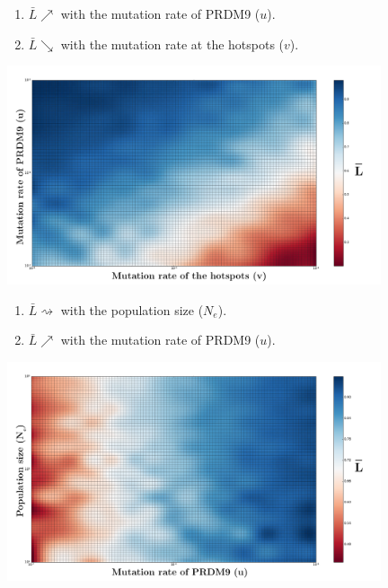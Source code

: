 \documentclass[10pt]{beamer}
\begin{document}
\begin{frame}
	\begin{center}
		\begin{enumerate}
		\item $\bar{L} \nearrow$ with the mutation rate of PRDM9 ($u$).
		
		\item $\bar{L} \searrow$ with the mutation rate at the hotspots ($v$).
	\end{enumerate}
       \includegraphics[width=11cm]{Images/mean-erosion-mutation-erosion.png}
	\end{center}
\end{frame}

\begin{frame}
	\begin{center}
		\begin{enumerate}
		\item $\bar{L} \rightsquigarrow$ with the population size ($N_e$).
		
		\item $\bar{L} \nearrow$ with the mutation rate of PRDM9 ($u$).
	\end{enumerate}
       \includegraphics[width=11cm]{Images/mean-erosion-population-mutation.png}
	\end{center}
\end{frame}
\end{document}
